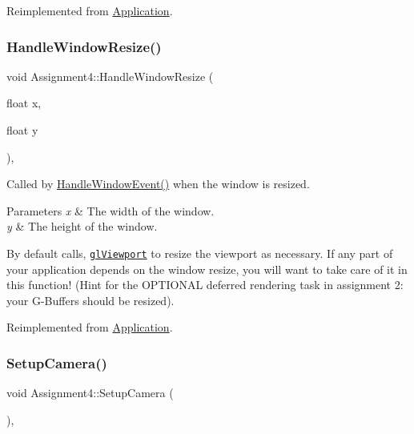 Reimplemented from \hyperlink{class_application_ae6074c3f102de1cb2fe4c81b545679db}{Application}.

\hypertarget{class_assignment4_ac79558272dc476db3ee4a99793f401f2}{}\label{class_assignment4_ac79558272dc476db3ee4a99793f401f2}
\subsubsection{\texorpdfstring{Handle\+Window\+Resize()}{HandleWindowResize()}}
{\footnotesize\ttfamily void Assignment4\+::\+Handle\+Window\+Resize (\begin{DoxyParamCaption}\item[{float}]{x,  }\item[{float}]{y }\end{DoxyParamCaption})\hspace{0.3cm}{\ttfamily [protected]}, {\ttfamily [virtual]}}



Called by \hyperlink{class_application_a74d92db64e051efa56d0357989dcb755}{Handle\+Window\+Event()} when the window is resized.


\begin{DoxyParams}{Parameters}
{\em x} & The width of the window. \\
\hline
{\em y} & The height of the window.\\
\hline
\end{DoxyParams}
By default calls, \href{https://www.opengl.org/sdk/docs/man/html/glViewport.xhtml}{\tt gl\+Viewport} to resize the viewport as necessary. If any part of your application depends on the window resize, you will want to take care of it in this function! (Hint for the O\+P\+T\+I\+O\+N\+AL deferred rendering task in assignment 2\+: your \textquotesingle{}G-\/\+Buffers\textquotesingle{} should be resized).

Reimplemented from \hyperlink{class_application_abdba284a0f075ee1d4a2108c3a5236a2}{Application}.

\hypertarget{class_assignment4_aa2bc15adb48cf54e477fce0c686cf2f0}{}\label{class_assignment4_aa2bc15adb48cf54e477fce0c686cf2f0}
\subsubsection{\texorpdfstring{Setup\+Camera()}{SetupCamera()}}
{\footnotesize\ttfamily void Assignment4\+::\+Setup\+Camera (\begin{DoxyParamCaption}{ }\end{DoxyParamCaption})\hspace{0.3cm}{\ttfamily [private]}, {\ttfamily [virtual]}}



